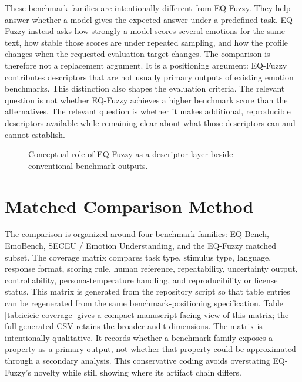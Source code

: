 \documentclass[12pt,a4paper]{icicel}
\begin{document}
These benchmark families are intentionally different from EQ-Fuzzy.
They help answer whether a model gives the expected answer under a predefined
task.
EQ-Fuzzy instead asks how strongly a model scores several emotions for the
same text, how stable those scores are under repeated sampling, and how the
profile changes when the requested evaluation target changes.
The comparison is therefore not a replacement argument.
It is a positioning argument: EQ-Fuzzy contributes descriptors that are not
usually primary outputs of existing emotion benchmarks.
This distinction also shapes the evaluation criteria.
The relevant question is not whether EQ-Fuzzy achieves a higher benchmark
score than the alternatives.
The relevant question is whether it makes additional, reproducible descriptors
available while remaining clear about what those descriptors can and cannot
establish.

\begin{table}[t]
\centering
\footnotesize
\caption{Compact benchmark-positioning matrix generated from the ICICIC comparison artifact.}
\label{tab:icicic-coverage}
{\tiny\setlength{\tabcolsep}{0pt}}
\end{table}

\begin{figure}[t]
\centering
{}
\caption{Conceptual role of EQ-Fuzzy as a descriptor layer beside conventional benchmark outputs.}
\label{fig:descriptor-layer}
\end{figure}

\section{Matched Comparison Method}
The comparison is organized around four benchmark families:
EQ-Bench, EmoBench, SECEU / Emotion Understanding, and the EQ-Fuzzy matched
subset.
The coverage matrix compares task type, stimulus type, language, response
format, scoring rule, human reference, repeatability, uncertainty output,
controllability, persona-temperature handling, and reproducibility or license
status.
This matrix is generated from the repository script so that table entries can
be regenerated from the same benchmark-positioning specification.
Table \ref{tab:icicic-coverage} gives a compact manuscript-facing view of this
matrix; the full generated CSV retains the broader audit dimensions.
The matrix is intentionally qualitative.
It records whether a benchmark family exposes a property as a primary output,
not whether that property could be approximated through a secondary analysis.
This conservative coding avoids overstating EQ-Fuzzy's novelty while still
showing where its artifact chain differs.
\end{document}
